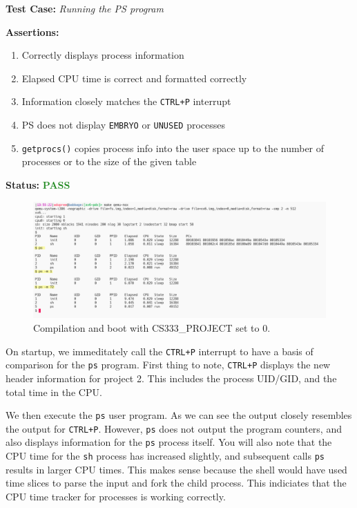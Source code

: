 \documentclass[11pt,letterpaper]{report}
\newcommand{\code}[1]{\colorbox{codegray}{\texttt{#1}}}
\begin{document}
{  \noindent\textbf{Test Case:} \emph{Running the PS program}
  
  \noindent\textbf{Assertions:}
  \begin{enumerate}[]
  \item Correctly displays process information
  \item Elapsed CPU time is correct and formatted correctly
  \item Information closely matches the \code{CTRL+P} interrupt
  \item PS does not display \code{EMBRYO} or \code{UNUSED} processes
  \item \code{getprocs()} copies process info into the user space up to the number of processes or to the size of the given table
  \end{enumerate}  
  
  \noindent\textbf{Status:} \textcolor{ForestGreen}{\textbf{PASS}}
  
  \begin{figure}[h!]
	\centering
	\includegraphics[width=1\linewidth]{ps-test.png}
	\caption[img]{Compilation and boot with CS333\_PROJECT set to 0.}
	\label{fig:P1compileP0-1}
  \end{figure}

  On startup, we immeditately call the \code{CTRL+P} interrupt to have a basis of comparison 
  for the \code{ps} program. First thing to note, \code{CTRL+P} displays the new header 
  information for project 2. This includes the process UID/GID, and the total time in the 
  CPU. 
  
  We then execute the \code{ps} user program. As we can see the output closely resembles the 
  output for \code{CTRL+P}. However, \code{ps} does not output the program counters, and also
  displays information for the \code{ps} process itself. You will also note that the CPU time
  for the \code{sh} process has increased slightly, and subsequent calls \code{ps} results in
  larger CPU times. This makes sense because the shell would have used time slices to 
  parse the input and fork the child process. This indiciates that the CPU time tracker 
  for processes is working correctly. 

}
\end{document}
